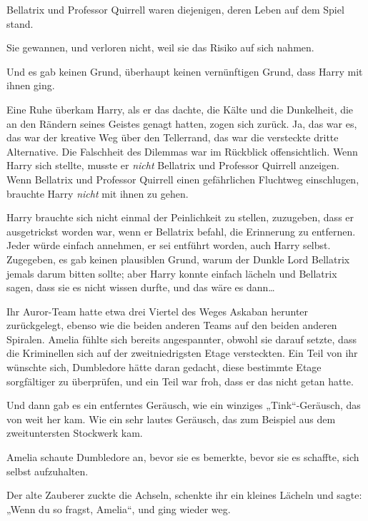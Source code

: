 {Bellatrix und Professor Quirrell waren diejenigen, deren Leben auf dem Spiel stand.

Sie gewannen, und verloren nicht, weil sie das Risiko auf sich nahmen.

Und es gab keinen Grund, überhaupt keinen vernünftigen Grund, dass Harry mit ihnen ging.

Eine Ruhe überkam Harry, als er das dachte, die Kälte und die Dunkelheit, die an den Rändern seines Geistes genagt hatten, zogen sich zurück. Ja, das war es, das war der kreative Weg über den Tellerrand, das war die versteckte dritte Alternative. Die Falschheit des Dilemmas war im Rückblick offensichtlich. Wenn Harry sich stellte, musste er \emph{nicht} Bellatrix und Professor Quirrell anzeigen. Wenn Bellatrix und Professor Quirrell einen gefährlichen Fluchtweg einschlugen, brauchte Harry \emph{nicht} mit ihnen zu gehen.

Harry brauchte sich nicht einmal der Peinlichkeit zu stellen, zuzugeben, dass er ausgetrickst worden war, wenn er Bellatrix befahl, die Erinnerung zu entfernen. Jeder würde einfach annehmen, er sei entführt worden, auch Harry selbst. Zugegeben, es gab keinen plausiblen Grund, warum der Dunkle Lord Bellatrix jemals darum bitten sollte; aber Harry konnte einfach lächeln und Bellatrix sagen, dass sie es nicht wissen durfte, und das wäre es dann…

Ihr Auror-Team hatte etwa drei Viertel des Weges Askaban herunter zurückgelegt, ebenso wie die beiden anderen Teams auf den beiden anderen Spiralen. Amelia fühlte sich bereits angespannter, obwohl sie darauf setzte, dass die Kriminellen sich auf der zweitniedrigsten Etage versteckten. Ein Teil von ihr wünschte sich, Dumbledore hätte daran gedacht, diese bestimmte Etage sorgfältiger zu überprüfen, und ein Teil war froh, dass er das nicht getan hatte.

Und dann gab es ein entferntes Geräusch, wie ein winziges „Tink“-Geräusch, das von weit her kam. Wie ein sehr lautes Geräusch, das zum Beispiel aus dem zweituntersten Stockwerk kam.

Amelia schaute Dumbledore an, bevor sie es bemerkte, bevor sie es schaffte, sich selbst aufzuhalten.

Der alte Zauberer zuckte die Achseln, schenkte ihr ein kleines Lächeln und sagte: „Wenn du so fragst, Amelia“, und ging wieder weg.

}
